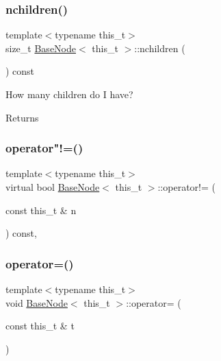 \subsubsection{\texorpdfstring{nchildren()}{nchildren()}}
{\footnotesize\ttfamily template$<$typename this\+\_\+t$>$ \\
size\+\_\+t \hyperlink{class_base_node}{Base\+Node}$<$ this\+\_\+t $>$\+::nchildren (\begin{DoxyParamCaption}{ }\end{DoxyParamCaption}) const\hspace{0.3cm}{\ttfamily [inline]}}

How many children do I have? \begin{DoxyReturn}{Returns}

\end{DoxyReturn}
\mbox{\label{class_base_node_a2f0418334eb790283f8074c9a27fed6e}} 
\subsubsection{\texorpdfstring{operator"!=()}{operator!=()}}
{\footnotesize\ttfamily template$<$typename this\+\_\+t$>$ \\
virtual bool \hyperlink{class_base_node}{Base\+Node}$<$ this\+\_\+t $>$\+::operator!= (\begin{DoxyParamCaption}\item[{const this\+\_\+t \&}]{n }\end{DoxyParamCaption}) const\hspace{0.3cm}{\ttfamily [inline]}, {\ttfamily [virtual]}}

\mbox{\label{class_base_node_a1a82f7670d09cdd2a7f12e00513b1d8f}} 
\subsubsection{\texorpdfstring{operator=()}{operator=()}\hspace{0.1cm}{\footnotesize\ttfamily [1/2]}}
{\footnotesize\ttfamily template$<$typename this\+\_\+t$>$ \\
void \hyperlink{class_base_node}{Base\+Node}$<$ this\+\_\+t $>$\+::operator= (\begin{DoxyParamCaption}\item[{const this\+\_\+t \&}]{t }\end{DoxyParamCaption})\hspace{0.3cm}{\ttfamily [inline]}}

